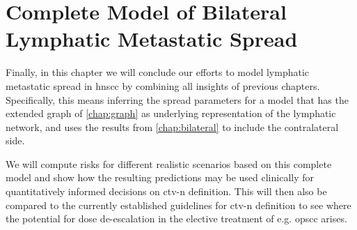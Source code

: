 \documentclass[\relativeRoot/main.tex]{subfiles}
\begin{document}
\chapter{Complete Model of Bilateral Lymphatic Metastatic Spread}
\label{chap:complete}

Finally, in this chapter we will conclude our efforts to model lymphatic metastatic spread in \gls{hnscc} by combining all insights of previous chapters. Specifically, this means inferring the spread parameters for a model that has the extended graph of \cref{chap:graph} as underlying representation of the lymphatic network, and uses the results from \cref{chap:bilateral} to include the contralateral side.

We will compute risks for different realistic scenarios based on this complete model and show how the resulting predictions may be used clinically for quantitatively informed decisions on \acrfull{ctv-n} definition. This will then also be compared to the currently established guidelines for \gls{ctv-n} definition to see where the potential for dose de-escalation in the elective treatment of e.g. \gls{opscc} arises.





\end{document}
